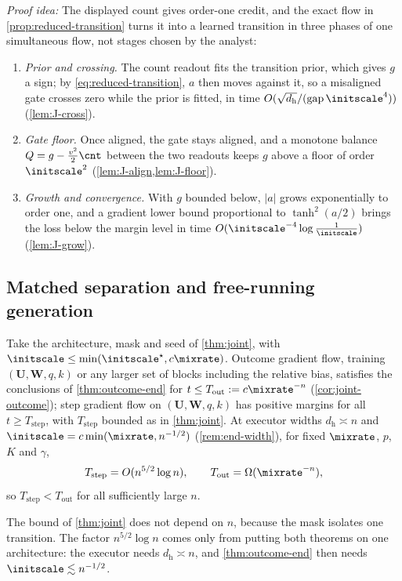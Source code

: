 \emph{Proof idea:} The displayed count gives order-one credit, and the exact flow in \cref{prop:reduced-transition} turns it into a
learned transition in three phases of one simultaneous flow, not stages chosen by the analyst:
\begin{enumerate}[label=(\arabic*),leftmargin=*,itemsep=0pt,topsep=2pt]
\item \emph{Prior and crossing.} The count readout fits the transition prior, which gives $g$ a sign; by \cref{eq:reduced-transition},
$a$ then moves against it, so a misaligned gate crosses zero while the prior is fitted, in time $O(\sqrt{d_{\mathrm h}}/(\mathrm{gap}\,\initscale^4))$ (\cref{lem:J-cross}).
\item \emph{Gate floor.} Once aligned, the gate stays aligned, and a monotone balance $Q=g-\frac{v^2}{2}\cnt$ between the two readouts keeps $g$ above a floor
of order $\initscale^2$ (\cref{lem:J-align,lem:J-floor}).
\item \emph{Growth and convergence.} With $g$ bounded below, $|a|$ grows exponentially to order one, and a gradient lower bound proportional
to $\tanh^2(a/2)$ brings the loss below the margin level in time $O(\initscale^{-4}\log\frac1\initscale)$ (\cref{lem:J-grow}).
\end{enumerate}

\subsection{Matched separation and free-running generation}

\begin{corollary}
\label{cor:matched}
Take the architecture, mask and seed of \cref{thm:joint}, with $\initscale\le\min(\initscale^\star,c\mixrate)$. Outcome gradient flow, training
$(\mathbf U,\mathbf W,q,k)$ or any larger set of blocks including the relative bias, satisfies the conclusions of \cref{thm:outcome-end} for
$t\le T_{\mathrm{out}}:=c\mixrate^{-n}$ (\cref{cor:joint-outcome}); step gradient flow on $(\mathbf U,\mathbf W,q,k)$ has positive margins for all
$t\ge T_{\mathrm{step}}$, with $T_{\mathrm{step}}$ bounded as in \cref{thm:joint}. At executor widths $d_{\mathrm h}\asymp n$ and
$\initscale=c\min(\mixrate,n^{-1/2})$ (\cref{rem:end-width}), for fixed $\mixrate$, $p$, $K$ and $\gamma$,
\[
 T_{\mathrm{step}}=O(n^{5/2}\log n),\qquad T_{\mathrm{out}}=\Omega(\mixrate^{-n}),
\]
so $T_{\mathrm{step}}<T_{\mathrm{out}}$ for all sufficiently large $n$.
\end{corollary}
The bound of \cref{thm:joint} does not depend on $n$, because the mask isolates one transition. The factor $n^{5/2}\log n$ comes only from
putting both theorems on one architecture: the executor needs $d_{\mathrm h}\asymp n$, and \cref{thm:outcome-end} then needs
$\initscale\lesssim n^{-1/2}$.

